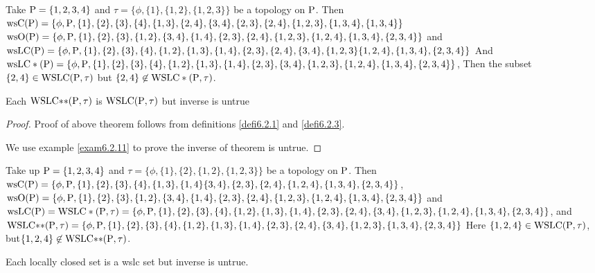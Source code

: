 \begin{exm}\label{exam6.2.9}
Take $\mathrm{P} = \{1, 2, 3, 4\}$ and $\tau = \{\phi, \{1\}, \{1, 2\}, \{1, 2, 3\}\}$ be a topology on $\mathrm{P}$. Then $\ws\TSC(\TSP) = \{\phi, \TSP,\{1\}, \{2\}, \{3\}, \{4\}, \{1, 3\}, \{2, 4\}, \{3,4\}, \{2,3\}, \{2,4\},\break \{1,2,3\},\{1,3,4\},\{1,3,4\}\}$ $\ws\TSO(\TSP) = \{\phi, \TSP, \{1\}, \{2\}, \{3\},\{1,2\}, \{3,4\}, \{1,4\}, \{2,3\},\break \{2,4\}, \{1,2, 3\}, \{1,2,4\},\{1,3,4\},\{2,3,4\}\}$ and $\ws\LC(\TSP)= \{\phi, \TSP ,\{1\}, \{2\}, \{3\},\{4\},\break \{1,2\},\{1,3\}, \{1,4\}, \{2,3\}, \{2,4\},\{3,4\}, \{1,2,3\}\{1,2,4\},\{1,3,4\},\{2,3,4\}\}$ And\break $\ws\LC*(\TSP)= \{\phi, \TSP ,\{1\}, \{2\}, \{3\}, \{4\},\{1,2\},\{1,3\}, \{1,4\}, \{2,3\}, \{3,4\}, \{1,2,3\},\break \{1,2,4\},\{1,3,4\},\{2,3,4\}\}$, Then the subset $\{2,4\} \in \mathrm{WSLC}(\mathrm{P}, \tau)$ but $\{2,4\}\not\in\break \WSLC*(\TSP, \tau)$.
\end{exm}

\begin{thm}\label{thm6.2.10}
Each $\mathrm{WSLC}{*}{*} (\mathrm{P}, \tau)$ is $\mathrm{WSLC} (\mathrm{P}, \tau)$ but inverse is untrue
\end{thm}

\begin{proof}
Proof of above theorem follows from definitions \ref{defi6.2.1} and \ref{defi6.2.3}.

We use example \ref{exam6.2.11} to prove the inverse of theorem is untrue.
\end{proof}

\begin{exm}\label{exam6.2.11}
Take up $\mathrm{P} = \{1, 2, 3, 4\}$ and $\tau = \{\phi, \{1\}, \{2\}, \{1, 2\}, \{1, 2, 3\}\}$ be a topology on $\mathrm{P}$. Then $\ws\TSC(\TSP) = \{\phi, \TSP,\{1\}, \{2\}, \{3\}, \{4\}, \{1, 3\}, \{1, 4\} \{3,4\}, \{2,3\},\break \{2,4\}, \{1,2,4\},\{1,3,4\},\{2,3,4\}\}$, $\ws\TSO(\TSP) = \{\phi, \TSP, \{1\}, \{2\}, \{3\},\{1,2\}, \{3,4\}, \{1,4\},\break \{2,3\}, \{2,4\}, \{1,2,3\},\{1,2,4\},\{1,3,4\},\{2,3,4\}\}$ and $\ws\LC(\TSP)= \WSLC*(\TSP, \tau) =\{\phi, \TSP ,\{1\}, \{2\}, \{3\}, \{4\}, \{1,2\}, \{1,3\}, \{1,4\}, \{2,3\}, \{2,4\}, \{3,4\}, \{1,2,3\}, \{1,2,4\},\break \{1,3,4\},\{2,3,4\}\}$, and $\WSLC{*}{*}(\TSP, \tau)= \{\phi, \TSP ,\{1\},\{2\}, \{3\},\{4\},\{1,2\},\{1,3\}, \{1,4\},\break \{2,3\}, \{2,4\},\{3,4\}, \{1,2,3\},\{1,3,4\},\{2,3,4\}\}$ Here $\{1,2,4\} \in \mathrm{WSLC} (\mathrm{P}, \tau)$, but\break $\{1, 2,4\}\not\in \mathrm{WSLC}{*}{*}(\mathrm{P}, \tau)$.
\end{exm}

\begin{thm}\label{thm6.2.12}
Each locally closed set is a wslc set but inverse is untrue.
\end{thm}

